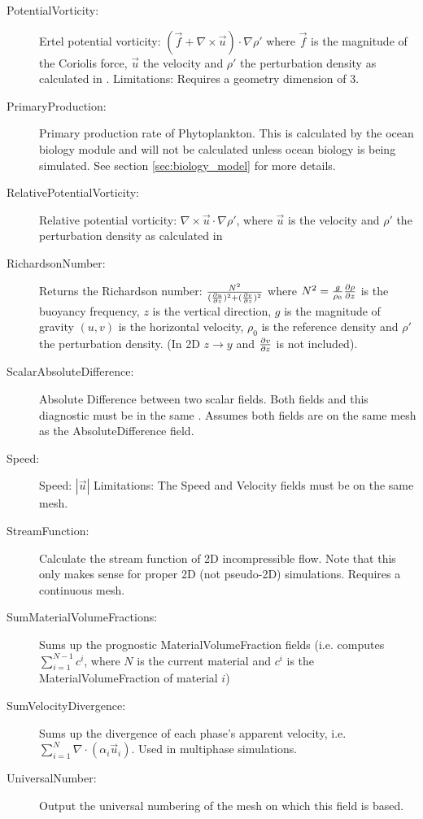 \begin{description}
\item[PotentialVorticity:]Ertel potential vorticity: $(\vec{f} + \nabla \times \vec{u}) \cdot \nabla \rho'$ where $\vec{f}$ is the magnitude of the Coriolis force, $\vec{u}$ the velocity and $\rho '$ the perturbation density as calculated in .
	Limitations: Requires a geometry dimension of 3.
\item[PrimaryProduction:]Primary production rate of Phytoplankton. This is calculated by the ocean biology module and will not be calculated unless ocean biology is being simulated.  See section \ref{sec:biology_model} for more details.
\item[RelativePotentialVorticity:]Relative potential vorticity:  $\nabla \times \vec{u} \cdot \nabla \rho'$, where $\vec{u}$ is the velocity and $\rho '$ the perturbation density as calculated in 
\item[RichardsonNumber:]Returns the Richardson number: $\frac{N^2}{(\ppt[z]{u})^2+(\ppx[z]{v})^2}$ where $N^2 = \frac{g}{\rho_0}\ppt[z]{\rho}$ is the buoyancy frequency, $z$ is the vertical direction, $g$ is the magnitude of gravity $(u,v)$ is the horizontal velocity, $\rho_0$ is the reference density and $\rho '$ the perturbation density. (In 2D $z\rightarrow y$ and $\ppx[z]{v}$ is not included).
\item[ScalarAbsoluteDifference:]Absolute Difference between two scalar fields. Both fields and this diagnostic  must be in the same . Assumes both fields are on the same mesh as the AbsoluteDifference field.
\item[Speed:]Speed: $|\vec{u}|$
	Limitations: The Speed and Velocity fields must be on the same mesh.
\item[StreamFunction:]Calculate the stream function of 2D incompressible flow. Note that this only makes sense for proper 2D (not pseudo-2D) simulations. Requires a continuous mesh.
\item[SumMaterialVolumeFractions:]Sums up the prognostic MaterialVolumeFraction fields (i.e. computes $\sum_{i=1}^{N-1}c^i$, where $N$ is the current material and $c^i$ is the MaterialVolumeFraction of material $i$)
\item[SumVelocityDivergence:]Sums up the divergence of each phase's apparent velocity, i.e. $\sum_{i=1}^N{\nabla\cdot(\alpha_i\vec{u}_i)}$. Used in multiphase simulations.
\item[UniversalNumber:]Output the universal numbering of the mesh on which this field is based.

\end{description}
